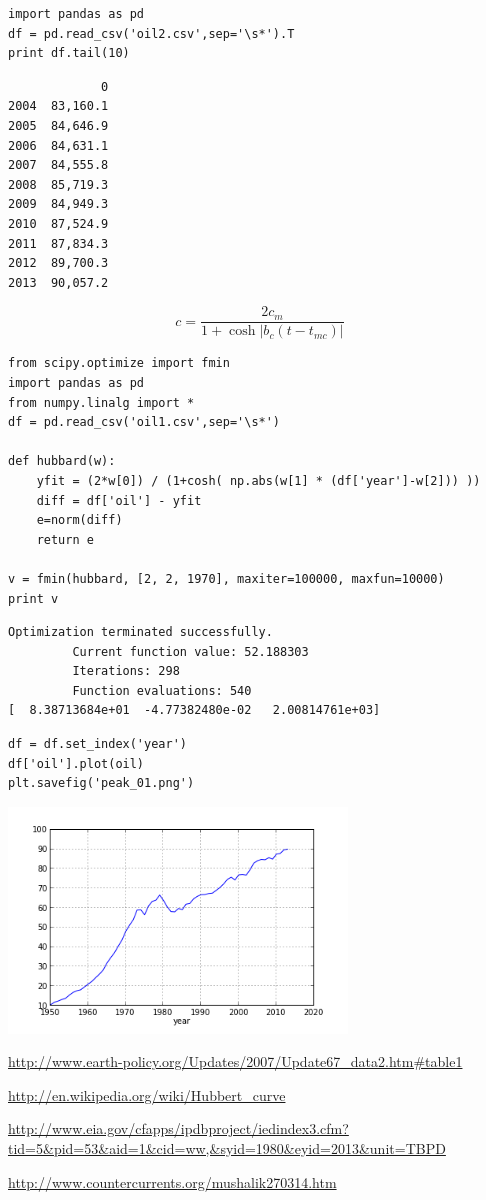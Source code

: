 \documentclass[12pt,fleqn]{article}\usepackage{../common}
\begin{document}
\begin{verbatim}
import pandas as pd
df = pd.read_csv('oil2.csv',sep='\s*').T
print df.tail(10)
\end{verbatim}

\begin{verbatim}
             0
2004  83,160.1
2005  84,646.9
2006  84,631.1
2007  84,555.8
2008  85,719.3
2009  84,949.3
2010  87,524.9
2011  87,834.3
2012  89,700.3
2013  90,057.2
\end{verbatim}

$$ 
c = \frac{ 2c_m}{1 + \cosh |b_c(t-t_{mc})|   }
$$


\begin{verbatim}
from scipy.optimize import fmin
import pandas as pd
from numpy.linalg import *
df = pd.read_csv('oil1.csv',sep='\s*')

def hubbard(w):
    yfit = (2*w[0]) / (1+cosh( np.abs(w[1] * (df['year']-w[2])) ))
    diff = df['oil'] - yfit
    e=norm(diff)
    return e

v = fmin(hubbard, [2, 2, 1970], maxiter=100000, maxfun=10000)
print v
\end{verbatim}

\begin{verbatim}
Optimization terminated successfully.
         Current function value: 52.188303
         Iterations: 298
         Function evaluations: 540
[  8.38713684e+01  -4.77382480e-02   2.00814761e+03]
\end{verbatim}

\begin{verbatim}
df = df.set_index('year')
df['oil'].plot(oil)
plt.savefig('peak_01.png')
\end{verbatim}

\includegraphics[height=6cm]{peak_01.png}

\url{http://www.earth-policy.org/Updates/2007/Update67_data2.htm#table1}

\url{http://en.wikipedia.org/wiki/Hubbert_curve}

\url{http://www.eia.gov/cfapps/ipdbproject/iedindex3.cfm?tid=5&pid=53&aid=1&cid=ww,&syid=1980&eyid=2013&unit=TBPD}

\url{http://www.countercurrents.org/mushalik270314.htm}
\end{document}
